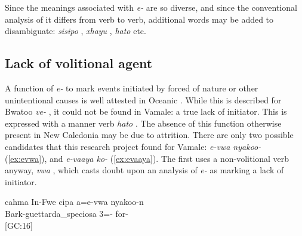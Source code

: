 Since the meanings associated with \textit{e-} are so diverse, and since the conventional analysis of it differs from verb to verb, additional words may be added to disambiguate: \textit{sisipo} , \textit{xhayu} , \textit{hato}  etc. 




\subsection{Lack of volitional agent}%
A function of \textit{e-} to mark events initiated by forced of nature or other unintentional causes is well attested in Oceanic \parencite[33]{bril_semantic_2005b}. While this is described for Bwatoo \textit{ve-} \parencite[310]{rivierre_bwatoo_2006}, it could not be found in Vamale: a true lack of initiator. This is expressed with a manner verb \textit{hato} . The absence of this function otherwise present in New Caledonia may be due to attrition. There are only two possible candidates that this research project found for Vamale: 
\textit{e-vwa nyakoo-}   (\ref{ex:evwa}), and \textit{e-vaaya ko-}  (\ref{ex:evaaya}). The first uses a non-volitional verb anyway, \textit{vwa} , which casts doubt upon an analysis of \textit{e-} as marking a lack of initiator. %


\ea\label{ex:evwa}
\gll cahma In-Fwe cipa a=e-vwa nyakoo-n\\ 
  Bark-guettarda\_speciosa
  3=- for-\\ 
\glt {} {[GC:16]}
\z


